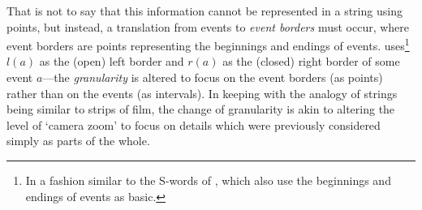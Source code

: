 \documentclass[a4paper,12pt,leqno,twoside]{article}
\begin{document}
That is not to say that this information cannot be represented in a string using points, but instead, a translation from events to \textit{event borders} must occur, where event borders are points representing the beginnings and endings of events. \citet{Fernando2018,fernando2018prior} uses\footnote{In a fashion similar to the S-words of \citet{durand2008reasoning,durand2008tool}, which also use the beginnings and endings of events as basic.} $l(a)$ as the (open) left border and $r(a)$ as the (closed) right border of some event $a$---the \textit{granularity} is altered to focus on the event borders (as points) rather than on the events (as intervals). In keeping with the analogy of strings being similar to strips of film, the change of granularity is akin to altering the level of `camera zoom' to focus on details which were previously considered simply as parts of the whole.
\end{document}
